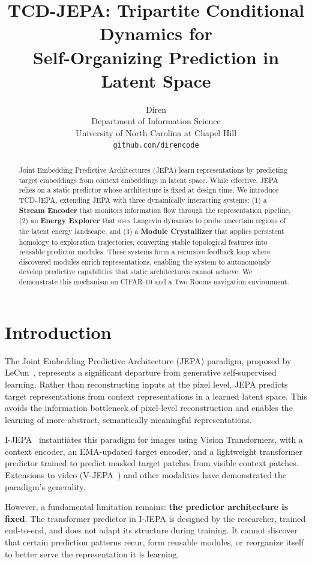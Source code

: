 \documentclass[10pt,twocolumn]{article}
\title{TCD-JEPA: Tripartite Conditional Dynamics for\\Self-Organizing Prediction in Latent Space}
\author{Diren\\
  Department of Information Science\\
  University of North Carolina at Chapel Hill\\
  \texttt{github.com/direncode}
}
\date{}
\begin{document}
\maketitle

\begin{abstract}
Joint Embedding Predictive Architectures (JEPA) learn representations by predicting target embeddings from context embeddings in latent space. While effective, JEPA relies on a static predictor whose architecture is fixed at design time. We introduce TCD-JEPA, extending JEPA with three dynamically interacting systems: (1) a \textbf{Stream Encoder} that monitors information flow through the representation pipeline, (2) an \textbf{Energy Explorer} that uses Langevin dynamics to probe uncertain regions of the latent energy landscape, and (3) a \textbf{Module Crystallizer} that applies persistent homology to exploration trajectories, converting stable topological features into reusable predictor modules. These systems form a recursive feedback loop where discovered modules enrich representations, enabling the system to autonomously develop predictive capabilities that static architectures cannot achieve. We demonstrate this mechanism on CIFAR-10 and a Two Rooms navigation environment.
\end{abstract}

\section{Introduction}

The Joint Embedding Predictive Architecture (JEPA) paradigm, proposed by LeCun~\citep{lecun2022path}, represents a significant departure from generative self-supervised learning. Rather than reconstructing inputs at the pixel level, JEPA predicts target representations from context representations in a learned latent space. This avoids the information bottleneck of pixel-level reconstruction and enables the learning of more abstract, semantically meaningful representations.

I-JEPA~\citep{assran2023self} instantiates this paradigm for images using Vision Transformers, with a context encoder, an EMA-updated target encoder, and a lightweight transformer predictor trained to predict masked target patches from visible context patches. Extensions to video (V-JEPA~\citep{bardes2024revisiting}) and other modalities have demonstrated the paradigm's generality.

However, a fundamental limitation remains: \textbf{the predictor architecture is fixed}. The transformer predictor in I-JEPA is designed by the researcher, trained end-to-end, and does not adapt its structure during training. It cannot discover that certain prediction patterns recur, form reusable modules, or reorganize itself to better serve the representation it is learning.
\end{document}
